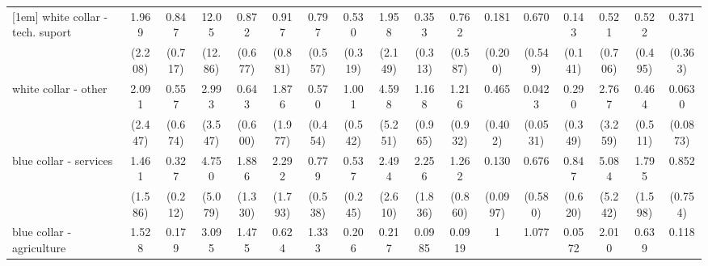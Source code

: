 {\begin{tabular}{l*{16}{c}}
[1em]
white collar - tech. suport&       1.969         &       0.847         &       12.05\sym{*}  &       0.872         &       0.917         &       0.797         &       0.530         &       1.958         &       0.353         &       0.762         &       0.181         &       0.670         &       0.143\sym{*}  &       0.521         &       0.522         &       0.371         \\
                    &     (2.208)         &     (0.717)         &     (12.86)         &     (0.677)         &     (0.881)         &     (0.557)         &     (0.319)         &     (2.149)         &     (0.313)         &     (0.587)         &     (0.200)         &     (0.549)         &     (0.141)         &     (0.706)         &     (0.495)         &     (0.363)         \\
[1em]
white collar - other&       2.091         &       0.557         &       2.993         &       0.643         &       1.876         &       0.570         &       1.001         &       4.598         &       1.168         &       1.216         &       0.465         &      0.0423\sym{*}  &       0.290         &       2.767         &       0.464         &      0.0630\sym{*}  \\
                    &     (2.447)         &     (0.674)         &     (3.547)         &     (0.600)         &     (1.977)         &     (0.454)         &     (0.542)         &     (5.251)         &     (0.965)         &     (0.932)         &     (0.402)         &    (0.0531)         &     (0.349)         &     (3.259)         &     (0.511)         &    (0.0873)         \\
[1em]
blue collar - services&       1.461         &       0.327         &       4.750         &       1.886         &       2.292         &       0.779         &       0.537         &       2.494         &       2.256         &       1.262         &       0.130\sym{**} &       0.676         &       0.847         &       5.084         &       1.795         &       0.852         \\
                    &     (1.586)         &     (0.212)         &     (5.079)         &     (1.330)         &     (1.793)         &     (0.538)         &     (0.245)         &     (2.610)         &     (1.836)         &     (0.860)         &    (0.0997)         &     (0.580)         &     (0.620)         &     (5.242)         &     (1.598)         &     (0.754)         \\
[1em]
blue collar - agriculture&       1.528         &       0.179         &       3.095         &       1.475         &       0.624         &       1.333         &       0.206         &       0.217         &      0.0985         &      0.0919\sym{*}  &           1         &       1.077         &      0.0572\sym{*}  &       2.010         &       0.639         &       0.118         \\

\end{tabular}}
